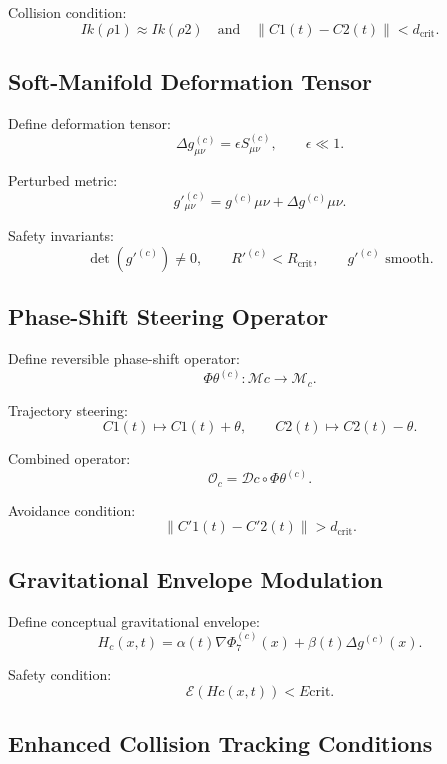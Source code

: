 Collision condition:
\[
Ik(\rho1) \approx Ik(\rho2)
\quad\text{and}\quad
\|C1(t) - C2(t)\| < d_{\text{crit}}.
\]

\subsection{Soft-Manifold Deformation Tensor}

Define deformation tensor:
\[
\Delta g^{(c)}_{\mu\nu}
= \epsilon S^{(c)}_{\mu\nu},
\qquad
\epsilon \ll 1.
\]

Perturbed metric:
\[
g'^{(c)}_{\mu\nu}
= g^{(c)}{\mu\nu} + \Delta g^{(c)}{\mu\nu}.
\]

Safety invariants:
\[
\det(g'^{(c)}) \neq 0,
\qquad
R'^{(c)} < R_{\text{crit}},
\qquad
g'^{(c)} \text{ smooth}.
\]

\subsection{Phase-Shift Steering Operator}

Define reversible phase-shift operator:
\[
\Phi\theta^{(c)} : \mathcal{M}c \to \mathcal{M}_c.
\]

Trajectory steering:
\[
C1(t) \mapsto C1(t) + \theta,
\qquad
C2(t) \mapsto C2(t) - \theta.
\]

Combined operator:
\[
\mathcal{O}_c
= \mathcal{D}c \circ \Phi\theta^{(c)}.
\]

Avoidance condition:
\[
\|C'1(t) - C'2(t)\| > d_{\text{crit}}.
\]

\subsection{Gravitational Envelope Modulation}

Define conceptual gravitational envelope:
\[
H_c(x,t)
= \alpha(t)\nabla \Phi_7^{(c)}(x)
+ \beta(t)\Delta g^{(c)}(x).
\]

Safety condition:
\[
\mathcal{E}(Hc(x,t)) < E{\text{crit}}.
\]

\subsection{Enhanced Collision Tracking Conditions}

